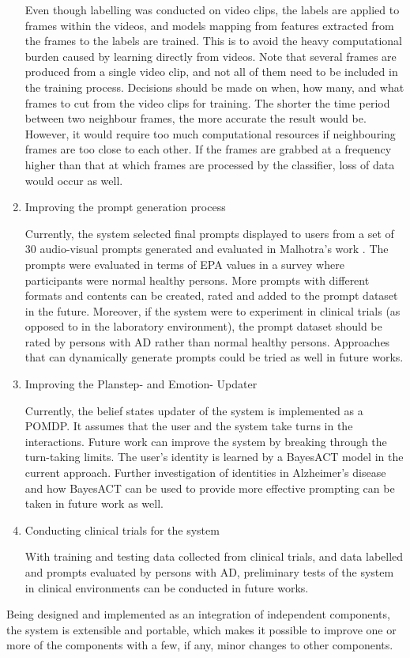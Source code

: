 \begin{enumerate}
Even though labelling was conducted on video clips, the labels are applied to frames within the videos, and models mapping from features extracted from the frames to the labels are trained. This is to avoid the heavy computational burden caused by learning directly from videos. Note that several frames are produced from a single video clip, and not all of them need to be included in the training process. Decisions should be made on when, how many, and what frames to cut from the video clips for training. The shorter the time period between two neighbour frames, the more accurate the result would be. However, it would require too much computational resources if neighbouring frames are too close to each other. If the frames are grabbed at a frequency higher than that at which frames are processed by the classifier, loss of data would occur as well.

\item{Improving the prompt generation process}

Currently, the system selected final prompts displayed to users from a set of 30 audio-visual prompts generated and evaluated in Malhotra's work \cite{malhotra2014}. The prompts were evaluated in terms of EPA values in a survey where participants were normal healthy persons. More prompts with different formats and contents can be created, rated and added to the prompt dataset in the future. Moreover, if the system were to experiment in clinical trials (as opposed to in the laboratory environment), the prompt dataset should be rated by persons with AD rather than normal healthy persons. Approaches that can dynamically generate prompts could be tried as well in future works.

\item{Improving the Planstep- and Emotion- Updater}

Currently, the belief states updater of the system is implemented as a POMDP. It assumes that the user and the system take turns in the interactions. Future work can improve the system by breaking through the turn-taking limits. The user's identity is learned by a BayesACT model in the current approach. Further investigation of identities in Alzheimer's disease and how BayesACT can be used to provide more effective prompting can be taken in future work as well.

\item{Conducting clinical trials for the system}

With training and testing data collected from clinical trials, and data labelled and prompts evaluated by persons with AD, preliminary tests of the system in clinical environments can be conducted in future works.

\end{enumerate}

Being designed and implemented as an integration of independent components, the system is extensible and portable, which makes it possible to improve one or more of the components with a few, if any, minor changes to other components.

